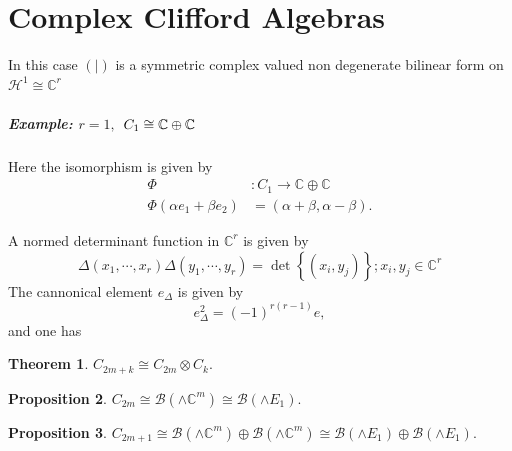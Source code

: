 \documentclass[aps,preprint]{revtex4}%
\newtheorem{theorem}{Theorem}
\newtheorem{proposition}[theorem]{Proposition}
\begin{document}
\section{Complex Clifford Algebras}

In this case $\left(  \left.  {}\right\vert \right)  $ is a symmetric complex
valued non degenerate bilinear form on $\mathcal{H}^{1}\cong\mathbb{C}^{r}$

\subparagraph{Example: $r=1,$ $C_{1}\protect\cong\mathbb{C\oplus C}$}

Here the isomorphism is given by
\begin{align}
\Phi &  :C_{1}\rightarrow\mathbb{C\oplus C}\\
\Phi\left(  \alpha e_{1}+\beta e_{2}\right)   &  =\left(  \alpha+\beta
,\alpha-\beta\right)  .
\end{align}


A normed determinant function in $\mathbb{C}^{r}$ is given by
\begin{equation}
\Delta\left(  x_{1},\cdots,x_{r}\right)  \Delta\left(  y_{1},\cdots
,y_{r}\right)  =\det\left\{  \left(  x_{i},y_{j}\right)  \right\}
;x_{i},y_{j}\in\mathbb{C}^{r}%
\end{equation}
The cannonical element $e_{\Delta}$ is given by
\begin{equation}
e_{\Delta}^{2}=\left(  -1\right)  ^{r\left(  r-1\right)  }e,
\end{equation}
and one has

\begin{theorem}
$C_{2m+k}\cong C_{2m}\otimes C_{k}.$
\end{theorem}

\begin{proposition}
$C_{2m}\cong\mathcal{B}\left(  \wedge\mathbb{C}^{m}\right)  \cong%
\mathcal{B}\left(  \wedge E_{1}\right)  .$
\end{proposition}

\begin{proposition}
$C_{2m+1}\cong\mathcal{B}\left(  \wedge\mathbb{C}^{m}\right)  \oplus
\mathcal{B}\left(  \wedge\mathbb{C}^{m}\right)  \cong\mathcal{B}\left(  \wedge
E_{1}\right)  \oplus\mathcal{B}\left(  \wedge E_{1}\right)  .$
\end{proposition}
\end{document}
